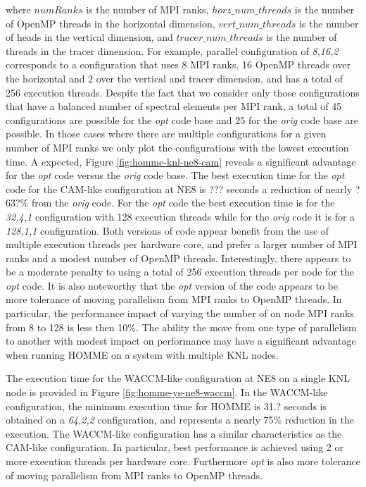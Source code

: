 where $numRanks$ is the number of MPI ranks, $horz\_num\_threads$ is the number of OpenMP threads in the horizontal dimension, $vert\_num\_threads$ is the number of heads in the vertical dimension, and $tracer\_num\_threads$ is the number of threads in the tracer dimension.  For example,  parallel configuration of {\em 8,16,2} corresponds to a configuration that uses 8 MPI ranks, 16 OpenMP threads over the horizontal and 2 over the vertical and tracer dimension, and has a total of 256 execution threads.   Despite the fact that we consider only those configurations that have a balanced number of spectral elements per MPI rank,  a total of 45 configurations are possible for the {\em opt} code base and 25 for the {\em orig} code base are possible.  In those cases where there are multiple configurations for a given number of MPI ranks we only plot the configurations with the lowest execution time.  A expected, Figure \ref{fig:homme-knl-ne8-cam} reveals a significant advantage for the {\em opt} code versus the {\em orig} code base.  The best execution time for the {\em opt} code for the CAM-like configuration at NE8 is ??? seconds a reduction of nearly ?63?\% from the {\em orig} code.  For the {\em opt} code the best execution time is for the {\em 32,4,1} configuration with 128 execution threads while for the {\em orig} code it is for a {\em 128,1,1} configuration.  Both versions of code appear benefit from the use of multiple execution threads per hardware core, and prefer a larger number of MPI ranks and a modest number of OpenMP threads.  Interestingly, there appears to be a moderate penalty to using a total of 256 execution threads per node for the {\em opt} code.  It is also noteworthy that the {\em opt} version of the code appears to be more tolerance of moving parallelism from MPI ranks to OpenMP threads.  In particular, the performance impact of varying the number of on node MPI ranks from 8 to 128 is less then 10\%.  The ability the move from one type of parallelism to another with modest impact on performance may have a significant advantage when running HOMME on a system with multiple KNL nodes.  

The execution time for the WACCM-like configuration at NE8 on a single KNL node is provided in Figure \ref{fig:homme-ys-ne8-waccm}.  In the WACCM-like configuration, the minimum execution time for HOMME is 31.? seconds is obtained on a {\em 64,2,2} configuration, and represents a nearly 75\% reduction in the execution. The WACCM-like configuration has a similar characteristics as the CAM-like configuration. In particular, best performance is achieved using 2 or more execution threads per hardware core.  Furthermore {\em opt} is also more tolerance of moving parallelism from MPI ranks to OpenMP threads.  

